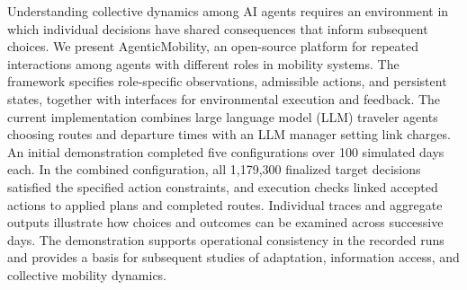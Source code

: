 
Understanding collective dynamics among AI agents requires an
environment in which individual decisions have shared
consequences that inform subsequent choices. We present
AgenticMobility, an open-source platform for repeated
interactions among agents with different roles in mobility
systems. The framework specifies role-specific observations,
admissible actions, and persistent states, together with
interfaces for environmental execution and feedback.
The current implementation combines large language model
(LLM) traveler agents choosing routes and departure times
with an LLM manager setting link charges. An initial
demonstration completed five configurations over 100 simulated
days each. In the combined configuration, all 1,179,300
finalized target decisions satisfied the specified action
constraints, and execution checks linked accepted actions
to applied plans and completed routes. Individual traces
and aggregate outputs illustrate how choices and outcomes
can be examined across successive days. The demonstration
supports operational consistency in the recorded runs and
provides a basis for subsequent studies of adaptation,
information access, and collective mobility dynamics.
